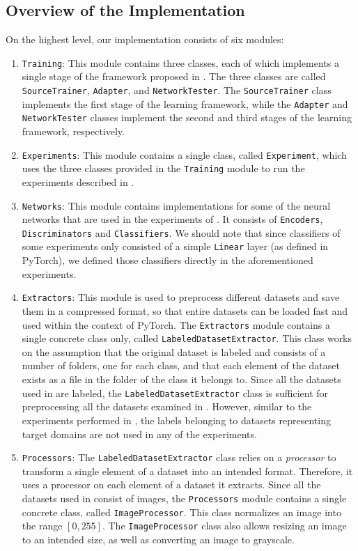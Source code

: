 \documentclass[14pt]{extarticle}
\begin{document}
		\subsection{Overview of the Implementation}
		On the highest level, our implementation consists of six modules:
		\begin{enumerate}
			\item \texttt{Training}: This module contains three classes, each of which implements a single stage of the framework proposed in \cite{adda}. The three classes are called \texttt{SourceTrainer}, \texttt{Adapter}, and \texttt{NetworkTester}. The \texttt{SourceTrainer} class implements the first stage of the learning framework, while the \texttt{Adapter} and \texttt{NetworkTester} classes implement the second and third stages of the learning framework, respectively.
			\item \texttt{Experiments}: This module contains a single class, called \texttt{Experiment}, which uses the three classes provided in the \texttt{Training} module to run the experiments described in \cite{adda}.
			\item \texttt{Networks}: This module contains implementations for some of the neural networks that are used in the experiments of \cite{adda}. It consists of \texttt{Encoders}, \texttt{Discriminators} and \texttt{Classifiers}. We should note that since classifiers of some experiments only consisted of a simple \texttt{Linear} layer (as defined in PyTorch), we defined those classifiers directly in the aforementioned experiments.
			\item \texttt{Extractors}: This module is used to preprocess different datasets and save them in a compressed format, so that entire datasets can be loaded fast and used within the context of PyTorch. The \texttt{Extractors} module contains a single concrete class only, called \texttt{LabeledDatasetExtractor}. This class works on the assumption that the original dataset is labeled and consists of a number of folders, one for each class, and that each element of the dataset exists as a file in the folder of the class it belongs to. Since all the datasets used in \cite{adda} are labeled, the \texttt{LabeledDatasetExtractor} class is sufficient for preprocessing all the datasets examined in \cite{adda}. However, similar to the experiments performed in \cite{adda}, the labels belonging to datasets representing target domains are not used in any of the experiments.
			\item \texttt{Processors}: The \texttt{LabeledDatasetExtractor} class relies on a \textit{processor} to transform a single element of a dataset into an intended format. Therefore, it uses a processor on each element of a dataset it extracts. Since all the datasets used in \cite{adda} consist of images, the \texttt{Processors} module contains a single concrete class, called \texttt{ImageProcessor}. This class normalizes an image into the range $[0, 255]$. The \texttt{ImageProcessor} class also allows resizing an image to an intended size, as well as converting an image to grayscale.

\end{enumerate}
\end{document}
